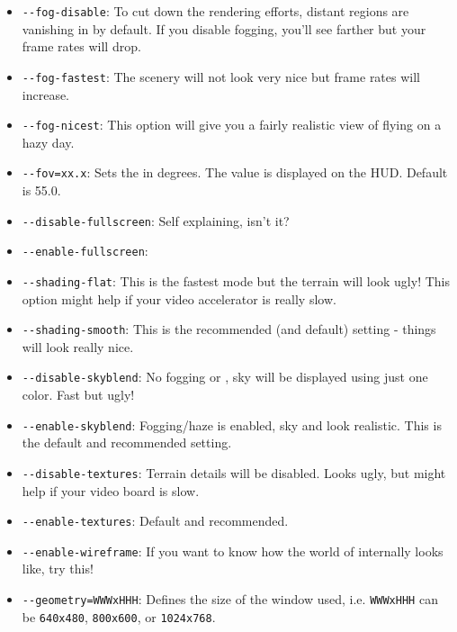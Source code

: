 \begin{itemize}

\item{\texttt{-$\!$-fog-disable}}: To cut down the rendering efforts, distant
  regions are vanishing in  by default. If you disable fogging,
  you'll see farther but your frame rates will drop.

\item{\texttt{-$\!$-fog-fastest}}: The scenery will not look very nice but
  frame rates will increase.

\item{\texttt{-$\!$-fog-nicest}}: This option will give you a fairly realistic
  view of flying on a hazy day.

\item{\texttt{-$\!$-fov=xx.x}}: Sets the  in degrees.
The value is displayed on the HUD. Default is 55.0.

\item{\texttt{-$\!$-disable-fullscreen}}: Self explaining, isn't it?

\item{\texttt{-$\!$-enable-fullscreen}}:

\item{\texttt{-$\!$-shading-flat}}: This is the fastest mode but the terrain will look ugly! This option might help if your video accelerator is really slow.

\item{\texttt{-$\!$-shading-smooth}}: This is the recommended (and default) setting - things will look really nice.

\item{\texttt{-$\!$-disable-skyblend}}: No fogging or , sky will be displayed
  using just one color. Fast but ugly!

\item{\texttt{-$\!$-enable-skyblend}}: Fogging/haze is enabled, sky and  look realistic. This is the default and recommended setting.

\item{\texttt{-$\!$-disable-textures}}: Terrain details will be disabled. Looks ugly, but might help if your video board is slow.

\item{\texttt{-$\!$-enable-textures}}: Default and recommended.

\item{\texttt{-$\!$-enable-wireframe}}: If you want to know how the world of \FlightGear internally looks like, try this!

\item{\texttt{-$\!$-geometry=WWWxHHH}}: Defines the size of the window used, i.e.
\texttt{WWWxHHH} can be \texttt{640x480}, \texttt{800x600}, or \texttt{1024x768}.

\end{itemize}

